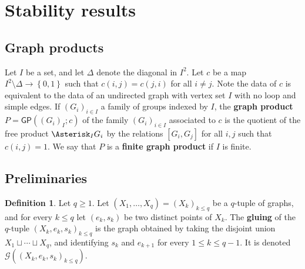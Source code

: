 \documentclass[11pt]{amsart}
\newcommand{\N}{\ensuremath{\mathbb{N}}}%
\newcommand{\vol}{\ensuremath{\operatorname{vol}}}%
\newcommand{\Class}{\ensuremath{\mathcal{C}}}
\theoremstyle{definition}
\newtheorem{defin}{Definition}[section]
\theoremstyle{plain}
\theoremstyle{remark}
\begin{document}
%



\section{Stability results}

\subsection{Graph products} \label{subsec-def-graph-prod}

Let $I$ be a set, and let $\Delta$ denote the diagonal in $I^2$. Let $c$ be a map $I^2 \setminus \Delta \to \left\lbrace 0,1 \right\rbrace$ such that $c(i,j) = c(j,i)$ for all $i \neq j$. Note the data of $c$ is equivalent to the data of an undirected graph with vertex set $I$ with no loop and simple edges. If $(G_i)_{i \in I}$ a family of groups indexed by $I$, the \textbf{graph product} $P =\mathsf{GP}((G_i)_{I}; c)$ of the family $(G_i)_{i \in I}$ associated to $c$ is the quotient of the free product $\Asterisk_I G_i$ by the relations $[G_i,G_j]$ for all $i,j$ such that $c(i,j)=1$. We say that $P$ is a \textbf{finite graph product} if $I$ is finite.

%


\subsection{Preliminaries}



\begin{defin}
	Let $q \geq 1$.	Let $(X_1,\ldots,X_q) = (X_k)_{k \leq q}$ be a $q$-tuple of graphs, and for every $k \leq q$ let $(e_k,s_k)$ be two distinct points of $X_k$. The \textbf{gluing} of the $q$-tuple $(X_k,e_k,s_k)_{k \leq q}$ is the graph obtained by taking the disjoint union $X_1 \sqcup \cdots \sqcup X_q$, and identifying $s_k$ and $e_{k+1}$ for every $1 \leq k \leq q-1$. It is denoted $\mathcal{G}((X_k,e_k,s_k)_{k \leq q})$. 
\end{defin}
\end{document}
